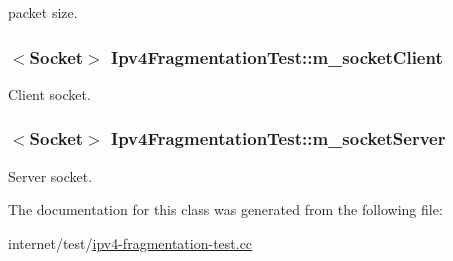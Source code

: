 packet size. 

\subsubsection[{\texorpdfstring{m\+\_\+socket\+Client}{m_socketClient}}]{$<${\bf Socket}$>$ Ipv4\+Fragmentation\+Test\+::m\+\_\+socket\+Client\hspace{0.3cm}{\ttfamily [private]}}\hypertarget{classIpv4FragmentationTest_a75297f7fa134ce427f34f866c4372877}{}\label{classIpv4FragmentationTest_a75297f7fa134ce427f34f866c4372877}


Client socket. 

\subsubsection[{\texorpdfstring{m\+\_\+socket\+Server}{m_socketServer}}]{$<${\bf Socket}$>$ Ipv4\+Fragmentation\+Test\+::m\+\_\+socket\+Server\hspace{0.3cm}{\ttfamily [private]}}\hypertarget{classIpv4FragmentationTest_a5960ce9f8f50e1635921f941c0388f15}{}\label{classIpv4FragmentationTest_a5960ce9f8f50e1635921f941c0388f15}


Server socket. 



The documentation for this class was generated from the following file\+:\begin{DoxyCompactItemize}
\item 
internet/test/\hyperlink{ipv4-fragmentation-test_8cc}{ipv4-\/fragmentation-\/test.\+cc}\end{DoxyCompactItemize}

